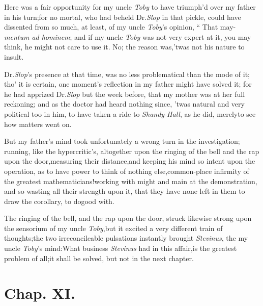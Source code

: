 \documentclass{article}
\begin{document}
Here was a fair opportunity for my uncle
\textit{Toby} to have triumph’d over my
father in his turn;\tsk for no mortal,
who had beheld Dr.\@ \textit{Slop} in
that pickle, could have dissented from
so much, at least, of my uncle
\textit{Toby}’s opinion, “\kern 2pt That may-\break
{}
\textit{mentum ad hominem}; and if my uncle
\textit{Toby} was not very expert at it,
you may think, he might not care to use
it.\tsk\break
No; the reason was,\tsk ’twas not his nature to insult.

\newpage
Dr.\@ \textit{Slop}’s presence at that time, was no less
problematical than the mode of it; tho’ it is certain, one
moment’s reflection in my father might have solved it; for he
had apprized Dr.\@ \textit{Slop} but the week before, that my mother was at her full reckoning;
and as the doctor had heard nothing since, ’twas natural and
very political too in him, to have taken a ride to
\textit{Shandy-Hall}, as he did, merely\break to see how matters went
on.

But my father’s mind took unfortunately a wrong turn in
the investigation; running, like the hypercritic’s,
altogether upon the ringing of the bell and the rap upon the
door,\tsk measuring their distance,\tsk and keeping his mind so
intent upon the operation, as to have power to think of nothing
else,\tsh common-place infirmity of the greatest
mathematicians!\pb working with might and main at the demonstration,
and so wasting all their strength upon it, that they have none left
in them to draw the corollary, to do\break good with.

The ringing of the bell, and the rap upon the door, struck
likewise strong upon the sensorium of my uncle
\textit{Toby},\tsk\break but it excited a very different train of
thoughts;\tsk the two irreconcileable pulsations instantly
brought \textit{Stevinus}, the\break
{}
my uncle \textit{Toby}’s mind:\tsk What business
\textit{Stevinus} had in this affair,\tsk is the greatest
problem of all;\tsh it shall be solved,\tsk\break
but not in the next chapter.

\newpage

\section{Chap. XI.}
\end{document}
